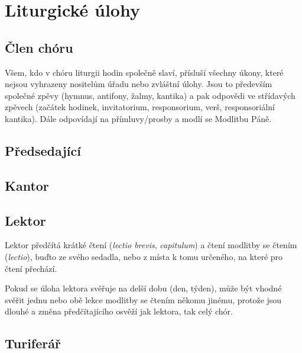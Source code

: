 \section{Liturgické úlohy}


\subsection{Člen chóru}

Všem, kdo v chóru liturgii hodin společně slaví, přísluší všechny úkony,
které nejsou vyhrazeny nositelům úřadu nebo zvláštní úlohy.
Jsou to především společné zpěvy 
(hymnus, antifony, žalmy, kantika)
a pak odpovědi ve střídavých zpěvech (začátek hodinek, invitatorium,
responsorium, verš, responsoriální kantika).
Dále odpovídají na přímluvy/prosby a modlí se Modlitbu Páně.

\subsection{Předsedající}
\subsection{Kantor}
\subsection{Lektor}

Lektor předčítá krátké čtení (\emph{lectio brevis}, \emph{capitulum}) 
a čtení modlitby se čtením (\emph{lectio}), buďto ze svého sedadla,
nebo z místa k tomu určeného, na které pro čtení přechází.

Pokud se úloha lektora svěřuje na delší dobu (den, týden), může být vhodné
svěřit jednu nebo obě lekce modlitby se čtením někomu jinému, protože jsou
dlouhé a změna předčítajícího osvěží jak lektora, tak celý chór.

\subsection{Turiferář}

